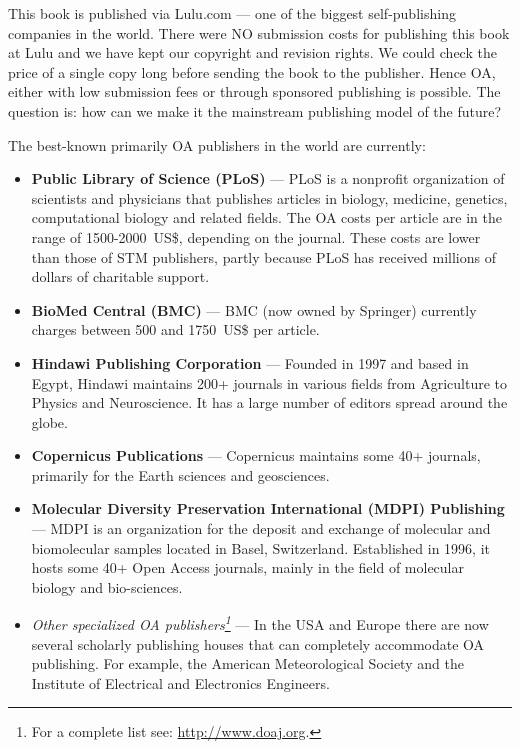 \documentclass[graybox,envcountchap,sectrefs,UStrade]{svmono}
\begin{document}
This book is published via Lulu.com --- one of the biggest self-publishing companies in the world. There were NO submission costs for publishing this book at Lulu and we have kept our copyright and revision rights. We could check the price of a single copy long before sending the book to the publisher. Hence OA, either with low submission fees or through sponsored publishing is possible. The question is: how can we make it the mainstream publishing model of the future?\par

The best-known primarily OA publishers in the world are currently:

\begin{itemize}
  \item \textbf{Public Library of Science (PLoS)} --- PLoS is a nonprofit organization of scientists and physicians that publishes articles in biology, medicine, genetics, computational biology and related fields. The OA costs per article are in the range of 1500-2000~US\$, depending on the journal. These costs are lower than those of STM publishers, partly because PLoS has received millions of dollars of charitable support.
  \item \textbf{BioMed Central (BMC)} --- BMC (now owned by Springer) currently charges between 500 and 1750~US\$ per article.
  \item \textbf{Hindawi Publishing Corporation} --- Founded in 1997 and based in Egypt, Hindawi maintains 200+ journals in various fields from Agriculture to Physics and Neuroscience. It has a large number of editors spread around the globe.
  \item \textbf{Copernicus Publications} --- Copernicus maintains some 40+ journals, primarily for the Earth sciences and geosciences.
  \item \textbf{Molecular Diversity Preservation International (MDPI) Publishing} --- MDPI is an organization for the deposit and exchange of molecular and biomolecular samples located in Basel, Switzerland. Established in 1996, it hosts some 40+ Open Access journals, mainly in the field of molecular biology and bio-sciences.
  \item \emph{Other specialized OA publishers\footnote{For a complete list see: \url{http://www.doaj.org}.}} --- In the USA and Europe there are now several scholarly publishing houses that can completely accommodate OA publishing. For example, the American Meteorological Society and the Institute of Electrical and Electronics Engineers.
\end{itemize}
\end{document}
